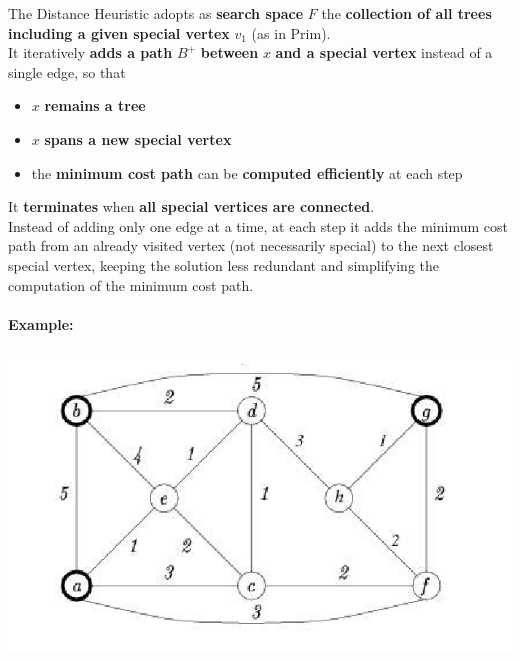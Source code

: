 The Distance Heuristic adopts as \textbf{search space} $F$ the \textbf{collection of all trees including a given special vertex} $v_1$ (as in Prim).\\

It iteratively \textbf{adds a path} $B^+$ \textbf{between} $x$ \textbf{and a special vertex} instead of a single edge, so that
\begin{itemize}
	\item $x$ \textbf{remains a tree}
	\item $x$ \textbf{spans a new special vertex}
	\item the \textbf{minimum cost path} can be \textbf{computed efficiently} at each step
\end{itemize}

It \textbf{terminates} when \textbf{all special vertices are connected}.\\

Instead of adding only one edge at a time, at each step it adds the minimum cost path from an already visited vertex (not necessarily special) to the next closest special vertex, keeping the solution less redundant and simplifying the computation of the minimum cost path.\\

\newpage

\paragraph{Example:}
\begin{center}
	\includegraphics[width=0.7\columnwidth]{img/STP2}
\end{center}

